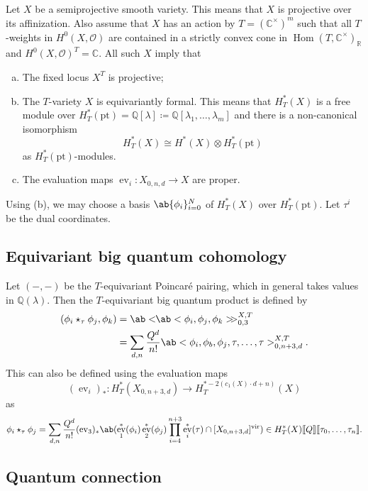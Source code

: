 \documentclass[leqno, openany]{memoir}
\theoremstyle{definition}
\theoremstyle{remark}
\theoremstyle{plain}
\theoremstyle{definition}
\theoremstyle{remark}
\newcommand{\R}{\mathbb{R}}
\newcommand{\C}{\mathbb{C}}
\newcommand{\Q}{\mathbb{Q}}
\newcommand{\mc}[1]{\mathcal{#1}}
\newcommand{\mr}[1]{\mathrm{#1}}
\newcommand{\on}[1]{\operatorname{#1}}
\newcommand{\vir}{\mr{vir}}
\DeclareMathOperator{\Hom}{Hom}
\DeclareMathOperator{\ev}{ev}
\begin{document}
Let $X$ be a semiprojective smooth variety. This means that $X$ is projective over its affinization. Also assume that $X$ has an action by $T = (\C^{\times})^m$ such that all $T$-weights in $H^0(X, \mc{O})$ are contained in a strictly convex cone in $\Hom(T, \C^{\times})_{\R}$ and $H^0(X, \mc{O})^T = \C$. All such $X$ imply that
\begin{enumerate}[(a)]
    \item The fixed locus $X^T$ is projective;
    \item The $T$-variety $X$ is equivariantly formal. This means that $H_T^*(X)$ is a free module over $H_T^*(\mr{pt}) = \Q[\lambda] \coloneqq \Q[\lambda_1, \ldots, \lambda_m]$ and there is a non-canonical isomorphism
        \[ H_T^*(X) \cong H^*(X) \otimes H_T^*(\mr{pt}) \]
        as $H_T^*(\mr{pt})$-modules.
    \item The evaluation maps $\on{ev}_i \colon X_{0,n,d} \to X$ are proper.
\end{enumerate}
Using (b), we may choose a basis $\ab\{\phi_i\}_{i=0}^N$ of $H_T^*(X)$ over $H_T^*(\mr{pt})$. Let $\tau^i$ be the dual coordinates.

\subsection{Equivariant big quantum cohomology}%
\label{sub:Equivariant big quantum cohomology}
Let $(-,-)$ be the $T$-equivariant Poincar\'e pairing, which in general takes values in $\Q(\lambda)$. Then the $T$-equivariant big quantum product is defined by
\begin{align*}
    (\phi_i \star_{\tau} \phi_j, \phi_k) &= \ab<\!\! \ab< \phi_i, \phi_j, \phi_k>\!\!>_{0,3}^{X,T} \\
    &= \sum_{d,n} \frac{Q^d}{n!} \ab<\phi_i, \phi_b, \phi_j,\tau, \ldots, \tau>_{0,n+3,d}^{X,T}. 
\end{align*}
This can also be defined using the evaluation maps
\[ (\on{ev}_i)_* \colon H_T^*(X_{0,n+3,d}) \to H_T^{*-2(c_1(X) \cdot d + n)}(X) \]
as
\[ \phi_i \star_{\tau} \phi_j = \sum_{d,n} \frac{Q^d}{n!} (\on{ev}_3)_* \ab(\ev_1^*(\phi_i) \ev_2^*(\phi_j) \prod_{i=4}^{n+3} \ev_i^*(\tau) \cap [X_{0,n+3,d}]^{\vir}) \in H_T^*(X)\llbracket Q \rrbracket \llbracket\tau_0,\ldots,\tau_n\rrbracket. \]

\subsection{Quantum connection}%
\label{sub:Quantum connection}
\end{document}

